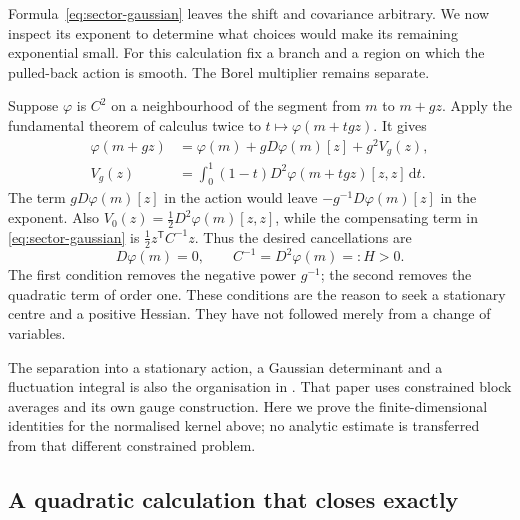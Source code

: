 \documentclass[11pt,reqno]{amsart}
\numberwithin{equation}{section}
\theoremstyle{definition}
\theoremstyle{remark}
\newcommand{\dd}{\mathrm d}
\begin{document}
Formula~\eqref{eq:sector-gaussian} leaves the shift and covariance
arbitrary. We now inspect its exponent to determine what choices
would make its remaining exponential small. For this calculation
fix a branch and a region on which the pulled-back action is smooth.
The Borel multiplier remains separate.

Suppose \(\varphi\) is \(C^2\) on a neighbourhood of the segment
from \(m\) to \(m+gz\). Apply the fundamental theorem of
calculus twice to \(t\mapsto\varphi(m+tgz)\). It gives
\begin{align}
 \varphi(m+gz)
 &=\varphi(m)+gD\varphi(m)[z]+g^2V_g(z),
       \label{eq:taylor-with-linear}\\
 V_g(z)&=\int_0^1(1-t)
                 D^2\varphi(m+tgz)[z,z]\,\dd t.
       \label{eq:taylor-integral}
\end{align}
The term \(gD\varphi(m)[z]\) in the action would leave
\(-g^{-1}D\varphi(m)[z]\) in the exponent. Also
\(V_0(z)=\tfrac12D^2\varphi(m)[z,z]\), while the compensating
term in \eqref{eq:sector-gaussian} is
\(\tfrac12z^{\mathsf T}C^{-1}z\). Thus the desired cancellations are
\begin{equation}
        D\varphi(m)=0,\qquad
        C^{-1}=D^2\varphi(m)=:H>0.
 \label{eq:desired-stationary-data}
\end{equation}
The first condition removes the negative power \(g^{-1}\); the
second removes the quadratic term of order one. These conditions
are the reason to seek a stationary centre and a positive Hessian.
They have not followed merely from a change of variables.

The separation into a stationary action, a Gaussian determinant
and a fluctuation integral is also the organisation in
\cite[Section~2, (2.10)--(2.13), pp.~267--268]{Bal87}.
That paper uses constrained block averages and its own gauge
construction. Here we prove the finite-dimensional identities
for the normalised kernel above; no analytic estimate is transferred
from that different constrained problem.

\subsection{A quadratic calculation that closes exactly}
\end{document}
